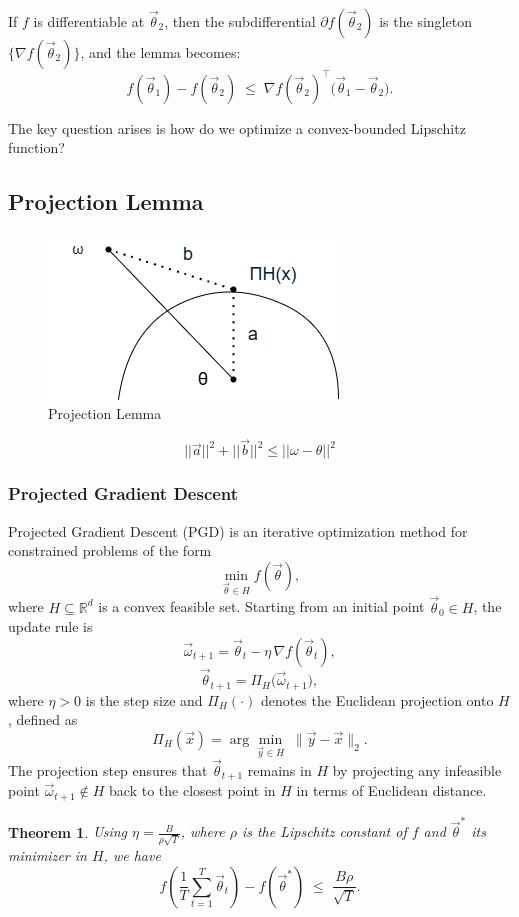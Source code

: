 \documentclass[11pt]{article}
\theoremstyle{plain}
\newtheorem{theorem}{Theorem}[section]
\begin{document}
If $f$ is differentiable at $\vec{\theta}_2$, then the subdifferential $\partial f(\vec{\theta}_2)$ is the singleton $\{\nabla f(\vec{\theta}_2)\}$, and the lemma becomes:
\[
    f(\vec{\theta}_1) - f(\vec{\theta}_2) \;\le\; \nabla f(\vec{\theta}_2)^\top \big(\vec{\theta}_1 - \vec{\theta}_2\big).
\]


The key question arises is how do we optimize a convex-bounded Lipschitz function?

\subsection{Projection Lemma}
\begin{figure}
    \centering
    \includegraphics[width=0.5\linewidth]{DS 603 diagram 001.png}
    \caption{Projection Lemma}
    \label{fig:placeholder}
\end{figure}

\[
\lvert\lvert\vec{a}\rvert\rvert^2 + \lvert\lvert\vec{b}\rvert\rvert^2 \leq \lvert\lvert \omega -\theta\rvert\rvert^2
\]

\subsubsection{Projected Gradient Descent}
Projected Gradient Descent (PGD) is an iterative optimization method for constrained problems of the form 
\[
    \min_{\vec{\theta} \in H} f(\vec{\theta}),
\]
where $H \subseteq \mathbb{R}^d$ is a convex feasible set.  
Starting from an initial point $\vec{\theta}_0 \in H$, the update rule is
\[
    \vec{\omega}_{t+1} = \vec{\theta}_t - \eta \, \nabla f(\vec{\theta}_t),
\]
\[
    \vec{\theta}_{t+1} = \Pi_H\big(\vec{\omega}_{t+1}\big),
\]
where $\eta > 0$ is the step size and $\Pi_H(\cdot)$ denotes the Euclidean projection onto $H$, defined as
\[
    \Pi_H(\vec{x}) = \arg\min_{\vec{y} \in H} \; \lVert \vec{y} - \vec{x} \rVert_2.
\]
The projection step ensures that $\vec{\theta}_{t+1}$ remains in $H$ by projecting any infeasible point $\vec{\omega}_{t+1} \notin H$ back to the closest point in $H$ in terms of Euclidean distance.

\begin{theorem}
Using $\eta = \frac{B}{\rho \sqrt{T}}$, where $\rho$ is the Lipschitz constant of $f$ and $\vec{\theta}^*$ its minimizer in $H$, we have
\[
    f\!\left( \frac{1}{T} \sum_{t=1}^T \vec{\theta}_t \right) - f(\vec{\theta}^*) \;\le\; \frac{B\rho}{\sqrt{T}}.
\]
\end{theorem}
\end{document}
